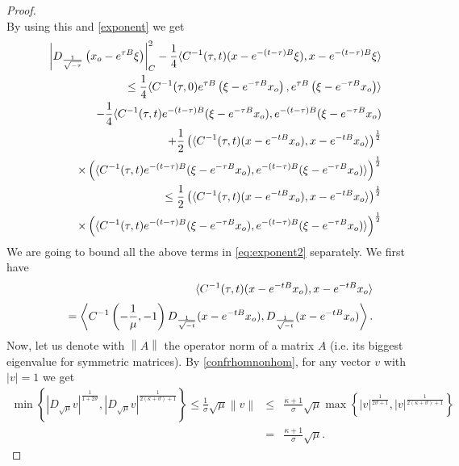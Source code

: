 \documentclass[10pt,a4paper]{amsart}
\begin{document}
\begin{proof}
$$ $$
 By using this and \eqref{exponent} we get
\begin{eqnarray}\label{eq:exponent2}
&&\left|D_{\frac{1}{\sqrt{-\tau}}}\left(x_{\rm o}-e^{\tau B}\xi\right)\right|_C^2-\frac{1}{4}\langle C^{-1}(\tau,t)(x-e^{-(t-\tau)B}\xi),x-e^{-(t-\tau)B}\xi\rangle\notag\\
 && \quad \leq  \frac{1}{4}\langle C^{-1}(\tau,0)e^{\tau B}\left(\xi - e^{-\tau B}x_{\rm o}\right),e^{\tau B}\left(\xi - e^{-\tau B}x_{\rm o}\right)\rangle \notag\\
 && \qquad -\frac{1}{4}\langle C^{-1}(\tau,t)e^{-(t-\tau)B}(\xi -e^{-\tau B}x_{\rm o}),e^{-(t-\tau)B}(\xi -e^{-\tau B}x_{\rm o})\notag\\
&& \qquad + \frac{1}{2}\left(\langle C^{-1}(\tau,t)(x-e^{-tB}x_{\rm o}),x-e^{-tB}x_{\rm o}\rangle\right)^\frac{1}{2}\notag\\
&& \qquad \times \left( \langle C^{-1}(\tau,t)e^{-(t-\tau)B}(\xi -e^{-\tau B}x_{\rm o}),e^{-(t-\tau)B}(\xi -e^{-\tau B}x_{\rm o})\rangle\right)^\frac{1}{2} \notag\\
&& \quad \leq \frac{1}{2}\left(\langle C^{-1}(\tau,t)(x-e^{-tB}x_{\rm o}),x-e^{-tB}x_{\rm o}\rangle\right)^\frac{1}{2}\\
&& \qquad \times \left( \langle C^{-1}(\tau,t)e^{-(t-\tau)B}(\xi -e^{-\tau B}x_{\rm o}),e^{-(t-\tau)B}(\xi -e^{-\tau B}x_{\rm o})\rangle\right)^\frac{1}{2}\notag
\end{eqnarray}
We are going to bound all the above terms in \eqref{eq:exponent2} separately. We first have
\begin{eqnarray*}
&& \langle C^{-1}(\tau,t)(x-e^{-tB}x_{\rm o}),x-e^{-tB}x_{\rm o}\rangle\\*[0.5ex]
&& \quad =\left\langle C^{-1}\left(-\frac{1}{\mu},-1\right)D_{\frac{1}{\sqrt{-t}}}(x-e^{-tB}x_{\rm o}),D_{\frac{1}{\sqrt{-t}}}(x-e^{-tB}x_{\rm o})\right\rangle.
\end{eqnarray*}
Now, let us denote with $\left\|A\right\|$ the operator norm of a matrix $A$ (i.e. its biggest eigenvalue for symmetric matrices). By \eqref{confrhomnonhom}, for any vector $v$ with $\left|v\right|=1$ we get
\begin{eqnarray*}
\min{\left\{\left|D_{\sqrt{\mu}}v\right|^\frac{1}{1+2\vartheta},\left|D_{\sqrt{\mu}}v\right|^{\frac{1}{2(\kappa+\vartheta)+1}}\right\}}\leq\frac{1}{\sigma}\sqrt{\mu}\left\|v\right\| & \leq & \frac{\kappa+1}{\sigma}\sqrt{\mu}\max{\left\{\left|v\right|^\frac{1}{2\vartheta+1},\left|v\right|^{\frac{1}{2(\kappa+\vartheta)+1}}\right\}}\\
& = & \frac{\kappa+1}{\sigma}\sqrt{\mu}.
\end{eqnarray*}


\end{proof}
\end{document}
